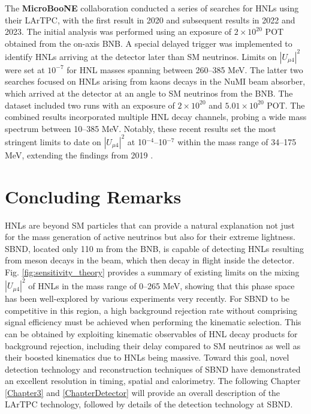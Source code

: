 \begin{coloritemize}
\item The \textbf{MicroBooNE} collaboration conducted a series of searches for HNLs using their LArTPC, with the first result in 2020 and subsequent results in 2022 and 2023.
The initial analysis was performed using an exposure of $2 \times 10^{20}$ POT obtained from the on-axis BNB.
A special delayed trigger was implemented to identify HNLs arriving at the detector later than SM neutrinos.
Limits on $|U_{\mu4}|^{2}$ were set at $10^{-7}$ for HNL masses spanning between 260--385 MeV.
The latter two searches focused on HNLs arising from kaons decays in the NuMI beam absorber, which arrived at the detector at an angle to SM neutrinos from the BNB.
The dataset included two runs with an exposure of $2 \times 10^{20}$ and $5.01 \times 10^{20}$ POT.
The combined results incorporated multiple HNL decay channels, probing a wide mass spectrum between 10--385 MeV.
Notably, these recent results set the most stringent limits to date on $|U_{\mu4}|^{2}$ at 10$^{-4}$--10$^{-7}$ within the mass range of 34--175 MeV, extending the findings from 2019 \cite{uboone1, uboone2, uboone3}.

\end{coloritemize}

\section{Concluding Remarks}
\label{sec2conclude}

HNLs are beyond SM particles that can provide a natural explanation not just for the mass generation of active neutrinos but also for their extreme lightness.
SBND, located only 110 m from the BNB, is capable of detecting HNLs resulting from meson decays in the beam, which then decay in flight inside the detector.
Fig. \ref{fig:sensitivity_theory} provides a summary of existing limits on the mixing $|U_{\mu4}|^2$ of HNLs in the mass range of 0--265 MeV, showing that this phase space has been well-explored by various experiments very recently.
For SBND to be competitive in this region, a high background rejection rate without comprising signal efficiency must be achieved when performing the kinematic selection.
This can be obtained by exploiting kinematic observables of HNL decay products for background rejection, including their delay compared to SM neutrinos as well as their boosted kinematics due to HNLs being massive. 
Toward this goal, novel detection technology and reconstruction techniques of SBND have demonstrated an excellent resolution in timing, spatial and calorimetry. 
The following Chapter \ref{Chapter3} and \ref{ChapterDetector} will provide an overall description of the LArTPC technology, followed by details of the detection technology at SBND.

